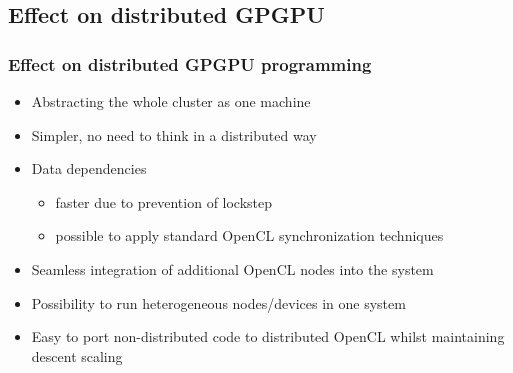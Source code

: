 \documentclass{beamer}
\begin{document}
\subsection{Effect on distributed GPGPU}

\begin{frame}
    \frametitle{Effect on distributed GPGPU programming}
    \begin{itemize}
        \item Abstracting the whole cluster as one machine
        \item Simpler, no need to think in a distributed way
        \item Data dependencies
        \begin{itemize}
            \item faster due to prevention of lockstep
            \item possible to apply standard OpenCL synchronization techniques
        \end{itemize}
        \item Seamless integration of additional OpenCL nodes into the system
        \item Possibility to run heterogeneous nodes/devices in one system
        \item Easy to port non-distributed code to distributed OpenCL whilst
              maintaining descent scaling
    \end{itemize}
\end{frame}

\end{document}
